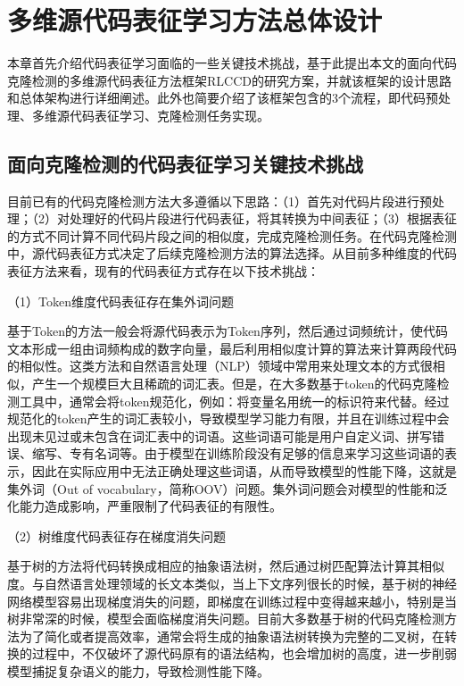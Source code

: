 \chapter{多维源代码表征学习方法总体设计}
\label{chap:design}

本章首先介绍代码表征学习面临的一些关键技术挑战，基于此提出本文的面向代码克隆检测的多维源代码表征方法框架RLCCD的研究方案，并就该框架的设计思路和总体架构进行详细阐述。此外也简要介绍了该框架包含的3个流程，即代码预处理、多维源代码表征学习、克隆检测任务实现。

\section{面向克隆检测的代码表征学习关键技术挑战}
\label{sec:challenges}

目前已有的代码克隆检测方法大多遵循以下思路：（1）首先对代码片段进行预处理；（2）对处理好的代码片段进行代码表征，将其转换为中间表征；（3）根据表征的方式不同计算不同代码片段之间的相似度，完成克隆检测任务。在代码克隆检测中，源代码表征方式决定了后续克隆检测方法的算法选择。从目前多种维度的代码表征方法来看，现有的代码表征方式存在以下技术挑战：

（1）Token维度代码表征存在集外词问题

基于Token的方法一般会将源代码表示为Token序列，然后通过词频统计，使代码文本形成一组由词频构成的数字向量，最后利用相似度计算的算法来计算两段代码的相似性。这类方法和自然语言处理（NLP）领域中常用来处理文本的方式很相似，产生一个规模巨大且稀疏的词汇表。但是，在大多数基于token的代码克隆检测工具中，通常会将token规范化，例如：将变量名用统一的标识符来代替。经过规范化的token产生的词汇表较小，导致模型学习能力有限，并且在训练过程中会出现未见过或未包含在词汇表中的词语。这些词语可能是用户自定义词、拼写错误、缩写、专有名词等。由于模型在训练阶段没有足够的信息来学习这些词语的表示，因此在实际应用中无法正确处理这些词语，从而导致模型的性能下降，这就是集外词（Out of vocabulary，简称OOV）问题。集外词问题会对模型的性能和泛化能力造成影响，严重限制了代码表征的有限性。

（2）树维度代码表征存在梯度消失问题

基于树的方法将代码转换成相应的抽象语法树，然后通过树匹配算法计算其相似度。与自然语言处理领域的长文本类似，当上下文序列很长的时候，基于树的神经网络模型容易出现梯度消失的问题，即梯度在训练过程中变得越来越小，特别是当树非常深的时候，模型会面临梯度消失问题。目前大多数基于树的代码克隆检测方法为了简化或者提高效率，通常会将生成的抽象语法树转换为完整的二叉树，在转换的过程中，不仅破坏了源代码原有的语法结构，也会增加树的高度，进一步削弱模型捕捉复杂语义的能力，导致检测性能下降。

